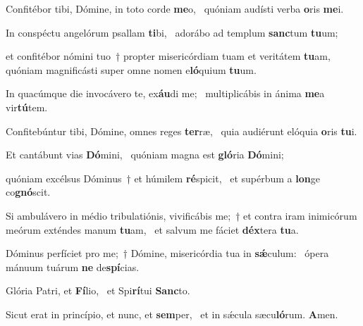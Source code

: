 \item Confitébor tibi, Dómine, in toto corde \textbf{me}o,~\psstar{} quóniam audísti verba \textbf{o}ris \textbf{me}i.

\item In conspéctu angelórum psallam \textbf{ti}bi,~\psstar{} adorábo ad templum \textbf{sanc}tum \textbf{tu}um;

\item et confitébor nómini tuo~† propter misericórdiam tuam et veritátem \textbf{tu}am,~\psstar{} quóniam magnificásti super omne nomen e\textbf{ló}quium \textbf{tu}um.

\item In quacúmque die invocávero te, ex\textbf{áu}di me;~\psstar{} multiplicábis in ánima \textbf{me}a vir\textbf{tú}tem.

\item Confitebúntur tibi, Dómine, omnes reges \textbf{ter}ræ,~\psstar{} quia audiérunt elóquia \textbf{o}ris \textbf{tu}i.

\item Et cantábunt vias \textbf{Dó}mini,~\psstar{} quóniam magna est \textbf{gló}ria \textbf{Dó}mini;

\item quóniam excélsus Dóminus~† et húmilem \textbf{ré}spicit,~\psstar{} et supérbum a \textbf{lon}ge co\textbf{gnó}scit.

\item Si ambulávero in médio tribulatiónis, vivificábis me;~† et contra iram inimicórum meórum exténdes manum \textbf{tu}am,~\psstar{} et salvum me fáciet \textbf{déx}tera \textbf{tu}a.

\item Dóminus perfíciet pro me;~† Dómine, misericórdia tua in \textbf{sǽ}culum:~\psstar{} ópera mánuum tuárum \textbf{ne} de\textbf{spí}cias.

\item Glória Patri, et \textbf{Fí}lio,~\psstar{} et Spi\textbf{rí}tui \textbf{Sanc}to.

\item Sicut erat in princípio, et nunc, et \textbf{sem}per,~\psstar{} et in sǽcula sæcu\textbf{ló}rum. \textbf{A}men.